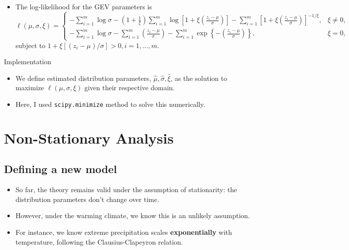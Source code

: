 \documentclass[
11pt,notheorems,hyperref={pdfauthor=whatever}
]{beamer}
\begin{document}
\begin{frame}
    \begin{itemize}
     \item The log-likelihood for the GEV parameters is
        \[
        \ell(\mu,\sigma,\xi)=
        \begin{cases}
        \displaystyle
        -\sum_{i=1}^m\log\sigma
        -\left(1+\frac{1}{\xi}\right)
        \sum_{i=1}^m
        \log\!\left[1+\xi\left(\frac{z_i-\mu}{\sigma}\right)\right]
        -\sum_{i=1}^m
        \left[1+\xi\left(\frac{z_i-\mu}{\sigma}\right)\right]^{-1/\xi},
        & \xi\neq 0,
        \\[2em]
        \displaystyle
        -\sum_{i=1}^m\log\sigma
        -\sum_{i=1}^m
        \left(\frac{z_i-\mu}{\sigma}\right)
        -\sum_{i=1}^m
        \exp\!\left\{
        -\left(\frac{z_i-\mu}{\sigma}\right)
        \right\},
        & \xi=0,
        \end{cases}
        \]
        subject to $1+\xi \left[ (z_i-\mu)/\sigma \right]>0, i=1,\dots,m.$
    \end{itemize}
    \begin{alertblock}{Implementation}
        \begin{itemize}
            \item We define estimated distribution parameters, $\hat{\mu}, \hat{\sigma}, \hat{\xi}$, as the solution to maximize $\ell(\mu, \sigma, \xi)$ given their respective domain.
            \item Here, I used \texttt{scipy.minimize} method to solve this numerically.
        \end{itemize}
    \end{alertblock}
\end{frame}

\section{Non-Stationary Analysis}
\subsection{Defining a new model}

\begin{frame}
    \begin{itemize}
        \item So far, the theory remains valid under the assumption of stationarity: the distribution parameters don't change over time.
        \item However, under the warming climate, we know this is an unlikely assumption.
        \item For instance, we know extreme precipitation scales \textbf{exponentially} with temperature, following the Clausius-Clapeyron relation.
    \end{itemize}
\end{frame}
\end{document}
